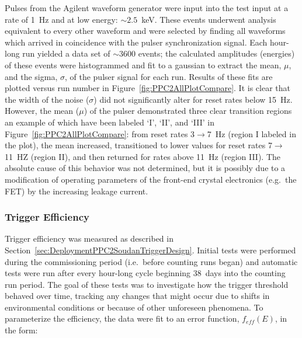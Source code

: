 	Pulses from the Agilent waveform generator were input into the test input at a rate of 1~Hz and at low energy: $\sim2.5$~keV.  These events underwent analysis equivalent to every other waveform and were selected by finding all waveforms which arrived in coincidence with the pulser synchronization signal.  Each hour-long run yielded a data set of $\sim3600$ events; the calculated amplitudes (energies) of these events were histogrammed and fit to a gaussian to extract the mean, $\mu$, and the sigma, $\sigma$, of the pulser signal for each run.  Results of these fits are plotted versus run number in Figure~\ref{fig:PPC2AllPlotCompare}.  It is clear that the width of the noise ($\sigma$) did not significantly alter for reset rates below 15~Hz.  However, the mean ($\mu$) of the pulser demonstrated three clear transition regions an example of which have been labeled `I', `II', and `III' in Figure~\ref{fig:PPC2AllPlotCompare}: from reset rates 3$\to$7~Hz (region I labeled in the plot), the mean increased, transitioned to lower values for reset rates 7$\to$11~HZ (region II), and then returned for rates above 11~Hz (region III).  The absolute cause of this behavior was not determined, but it is possibly due to a modification of operating parameters of the front-end crystal electronics (e.g.~the FET) by the increasing leakage current.  




		    	\subsubsection{Trigger Efficiency}
			\label{sec:DeploymentPPC2SoudanAnalysisTriggerEfficiency}    
			
	Trigger efficiency was measured as described in Section~\ref{sec:DeploymentPPC2SoudanTriggerDesign}.  Initial tests were performed during the commissioning period (i.e.~before counting runs began) and automatic tests were run after every hour-long cycle beginning 38~days into the counting run period.  The goal of these tests was to investigate how the trigger threshold behaved over time, tracking any changes that might occur due to shifts in environmental conditions or because of other unforeseen phenomena.  To parameterize the efficiency, the data were fit to an error function, $f_{eff}(E)$, in the form:

